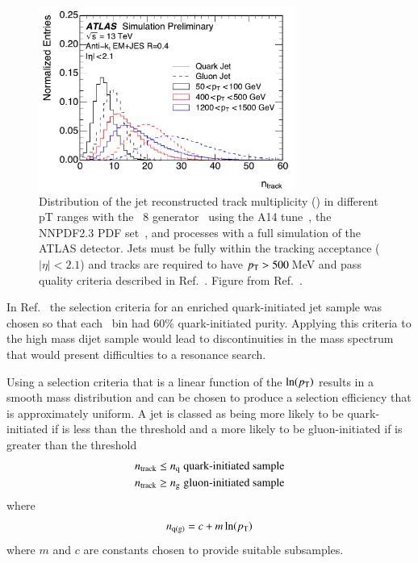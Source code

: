 \begin{figure}[htb]
 \centering
\includegraphics[width=0.75\textwidth]{figures/tagging/fig_01_ATL-PHYS-PUB-2017-009.pdf}
\caption{Distribution of the jet reconstructed track multiplicity (\ntrk ) in
 different pT ranges with the \Pythia~8 generator~\cite{pythia8} using
 the A14 tune~\cite{A14tune}, the NNPDF2.3 PDF
 set~\cite{Carrazza:2013axa}, and processes with a full simulation of the
 ATLAS detector. Jets must be fully within the tracking acceptance
 ($|\eta|<2.1$) and tracks are required to have $p_{\mathrm T} > 500$\,MeV and pass
  quality criteria described in Ref.~\cite{ATL-PHYS-PUB-2017-009}. Figure
 from Ref.~\cite{ATL-PHYS-PUB-2017-009}. \label{fig:jet_pt_quark_gluon}}
\end{figure}

In Ref.~\cite{ATL-PHYS-PUB-2017-009}  the selection criteria for  an
enriched quark-initiated jet sample was chosen so that each \pT\ bin had
60\% quark-initiated purity. Applying this criteria to the high mass
dijet sample would lead to discontinuities in the mass spectrum that
would present difficulties to a resonance search. 

Using a selection criteria that is a linear function of the \( \ln(p_{\mathrm T}) \) 
results in a smooth mass distribution and can be chosen to produce a  
selection efficiency that is approximately uniform. 
A jet is classed as being more likely to be quark-initiated if \ntrk is less than
the threshold \nq and a more likely to be gluon-initiated if \ntrk is 
greater than the threshold \ngluon  
\begin{align}
n_{\textrm{track}} & \le n_{\textrm{q}} \; \mbox{quark-initiated sample} \label{eq:QGselect} \\
n_{\textrm{track}}	  & \ge n_{\textrm{g}} \; \mbox{gluon-initiated sample} \nonumber
\end{align}
where   
\begin{equation}
n_{\mathrm{q(g)}} = {c + m \ln(p_{\mathrm T})}  \label{eq:nqg2}
\end{equation}
where $m$ and $c$ are constants chosen to provide suitable subsamples.

